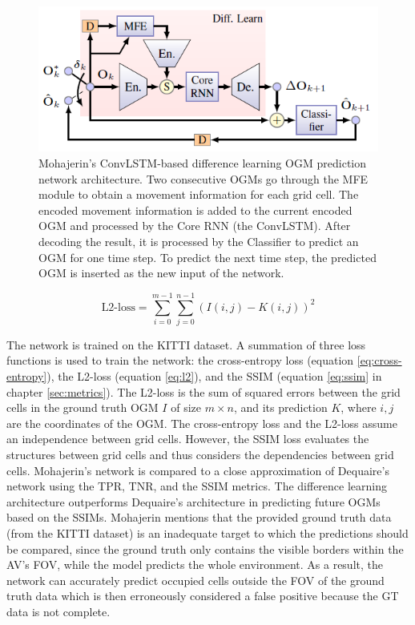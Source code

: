 \begin{figure}[h]
	\centering
	\includegraphics[width=0.6\linewidth]{Figures/Methods/Difference_Learning}
	\caption{Mohajerin's \cite{mohajerin2019multi} \gls{ConvLSTM}-based difference learning \gls{OGM} prediction network architecture. Two consecutive \glspl{OGM} go through the \gls{MFE} module to obtain a movement information for each grid cell. The encoded movement information is added to the current encoded \gls{OGM} and processed by the Core \gls{RNN} (the \gls{ConvLSTM}). After decoding the result, it is processed by the Classifier to predict an \gls{OGM} for one time step. To predict the next time step, the predicted \gls{OGM} is inserted as the new input of the network.}
	\label{fig:diff_learn}
\end{figure}

\begin{equation} \label{eq:l2}
	\text{L2-loss} = \sum_{i=0}^{m-1}\sum_{j=0}^{n-1}(I(i,j)-K(i,j))^2
\end{equation}

The network is trained on the \gls{KITTI} \cite{geiger2013vision} dataset. A summation of three loss functions is used to train the network: the cross-entropy loss (equation \ref{eq:cross-entropy}), the L2-loss (equation \ref{eq:l2}), and the \gls{SSIM} (equation \ref{eq:ssim} in chapter \ref{sec:metrics}). The L2-loss is the sum of squared errors between the grid cells in the ground truth \gls{OGM} $I$ of size $m \times n$, and its prediction $K$, where $i, j$ are the coordinates of the \gls{OGM}. The cross-entropy loss and the L2-loss assume an independence between grid cells. However, the \gls{SSIM} loss evaluates the structures between grid cells and thus considers the dependencies between grid cells. Mohajerin's \cite{mohajerin2019multi} network is compared to a close approximation of Dequaire's \cite{dequaire2018deep} network using the \gls{TPR}, \gls{TNR}, and the \gls{SSIM} metrics. 
The difference learning architecture outperforms Dequaire's \cite{dequaire2018deep} architecture in predicting future \glspl{OGM} based on the \glspl{SSIM}. Mohajerin \cite{mohajerin2019multi} mentions that the provided ground truth data (from the \gls{KITTI} \cite{geiger2013vision} dataset) is an inadequate target to which the predictions should be compared, since the ground truth only contains the visible borders within the \gls{AV}'s FOV, while the model predicts the whole environment. As a result, the network can accurately predict occupied cells outside the FOV of the ground truth data which is then erroneously considered a false positive because the GT data is not complete.

